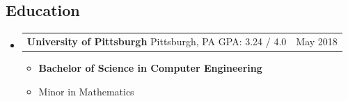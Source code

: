 \documentclass[20pt]{article}
\makeatletter
\providecommand{\tightlist}{
    \setlength{\itemsep}{0pt}\setlength{\parskip}{0pt}
}
\providecommand{\datetable}[2]{
    \begin{tabular*}{\textwidth}{@{}r @{\extracolsep{\fill}} l}
        #1 & #2
    \end{tabular*}
}
\makeatother
\begin{document}
\begin{itemize}[label={}]


    \end{itemize}

    \subsection*{Education}\label{education}
    \begin{itemize}[label={}]

        \item \datetable{
            \textbf{University of Pittsburgh} \textbar{} Pittsburgh, PA \textbar{} GPA: 3.24 / 4.0
        }{May 2018}
        \begin{itemize}[ topsep=0pt]\tightlist
            \item \textbf{Bachelor of Science in Computer Engineering}
            \item Minor in Mathematics
        \end{itemize}
    \end{itemize}
\end{document}
